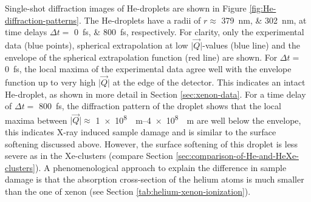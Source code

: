 Single-shot diffraction images of He-droplets are shown in Figure \ref{fig:He-diffraction-patterns}. The He-droplets have a radii of $r\approx$ \SIlist{379;302}{\nano\meter}, at time delays $\Delta t=$ \SIlist{0;800}{\femto\second}, respectively. For clarity, only the experimental data (blue points), spherical extrapolation at low $\lvert\vec{Q}\rvert$-values (blue line) and the envelope of the spherical extrapolation function (red line) are shown. For $\Delta t =$ \SI{0}{\femto\second}, the local maxima of the experimental data agree well with the envelope function up to very high $\lvert\vec{Q}\rvert$ at the edge of the detector. This indicates an intact He-droplet, as shown in more detail in Section \ref{sec:xenon-data}. For a time delay of $\Delta t=$ \SI{800}{\femto\second}, the diffraction pattern of the droplet shows that the local maxima between $\lvert\vec{Q}\rvert \approx$ \SIrange[scientific-notation=fixed, fixed-exponent=8]{1e8}{4e8}{\per\meter} are well below the envelope, this indicates X-ray induced sample damage and is similar to the surface softening discussed above. However, the surface softening of this droplet is less severe as in the Xe-clusters (compare Section \ref{sec:comparison-of-He-and-HeXe-clusters}).
A phenomenological approach to explain the difference in sample damage is that the absorption cross-section of the helium atoms is much smaller than the one of xenon (see Section \ref{tab:helium-xenon-ionization}).
%
%
%
%
